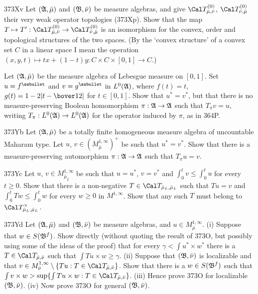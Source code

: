 {\spheader 373Xv Let $(\frak A,\bar\mu)$ and $(\frak B,\bar\nu)$ be
measure algebras, and give $\Cal T^{(0)}_{\bar\mu,\bar\nu}$, $\Cal
T^{(0)}_{\bar\nu,\bar\mu}$ their very weak operator topologies (373Xp).
Show that the map $T\mapsto T':\Cal T^{(0)}_{\bar\mu,\bar\nu}\to\Cal
T^{(0)}_{\bar\nu,\bar\mu}$ is an isomorphism for the convex, order and
topological structures of the two spaces.   (By the `convex
structure' of a convex set $C$ in a linear space I mean the operation
$(x,y,t)\mapsto tx+(1-t)y:C\times C\times[0,1]\to C$.)
     
     
Let $(\frak A,\bar\mu)$ be the measure algebra of Lebesgue measure on
$[0,1]$.   Set $u=f^{\ssbullet}$ and $v=g^{\ssbullet}$ in $L^0(\frak
A)$, where $f(t)=t$,
$g(t)=1-2|t-\bover12|$ for $t\in[0,1]$.   Show that $u^*=v^*$, but that
there is no measure-preserving Boolean homomorphism $\pi:\frak A\to\frak
A$ such that $T_{\pi}v=u$, writing 
$T_{\pi}:L^0(\frak A)\to L^0(\frak A)$ for the operator induced by $\pi$, 
as in 364P.   
     
\spheader 373Yb Let $(\frak A,\bar\mu)$ be a totally finite homogeneous
measure algebra of uncountable Maharam type.   Let $u$,
$v\in(M^{1,\infty}_{\bar\mu})^+$ be such that $u^*=v^*$.   Show
that there is a
measure-preserving automorphism $\pi:\frak A\to\frak A$ such that
$T_{\pi}u=v$.
     
\spheader 373Yc Let $u$, $v\in M^{1,\infty}_{\bar\mu_L}$ be such that
$u=u^*$, $v=v^*$ and
$\int_0^tv\le\int_0^tu$ for every $t\ge 0$.   Show that there is a
non-negative $T\in\Cal T_{\bar\mu_L,\bar\mu_L}$ such that $Tu=v$ and
$\int_0^tTw\le\int_0^tw$ for every $w\ge 0$ in $M^{1,\infty}$.   Show
that any such $T$ must belong to $\Cal
T^{\times}_{\bar\mu_L,\bar\mu_L}$.
     
\spheader 373Yd Let $(\frak A,\bar\mu)$ and $(\frak B,\bar\nu)$ be
measure algebras, and $u\in M^{1,\infty}_{\bar\mu}$.  (i) Suppose that
$w\in S(\frak B^f)$.   Show directly (without quoting the result of
373O, but possibly using some of the ideas of the proof) that for every
$\gamma<\int u^*\times w^*$ there is a $T\in\Cal T_{\bar\mu,\bar\nu}$
such that $\int Tu\times w\ge\gamma$.
(ii) Suppose that $(\frak B,\bar\nu)$ is localizable and that $v\in
M^{1,\infty}_{\bar\nu}\setminus\{Tu:T\in\Cal
T_{\bar\mu,\bar\nu}\}$.   Show that there is a $w\in S(\frak B^f)$ such
that $\int v\times w>\sup\{\int Tu\times w:T\in\Cal
T_{\bar\mu,\bar\nu}\}$.      (iii) Hence prove 373O
for localizable $(\frak B,\bar\nu)$.   (iv) Now prove 373O for general
$(\frak B,\bar\nu)$.
     
}
